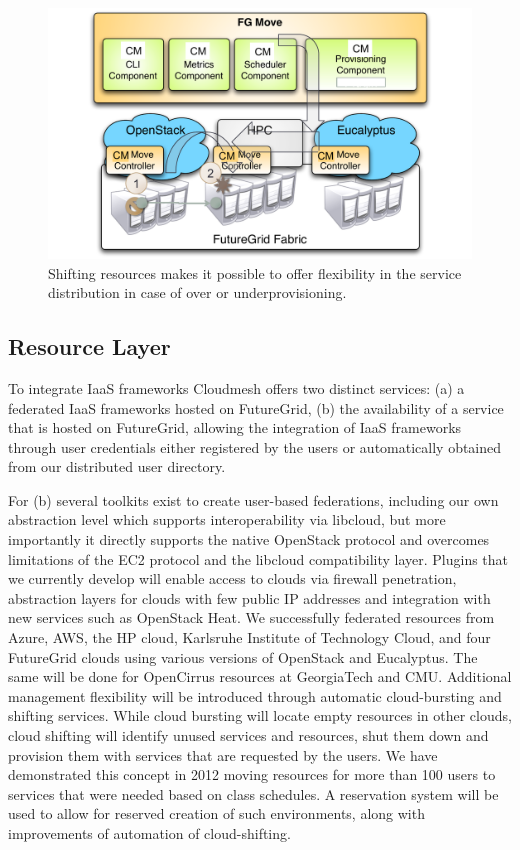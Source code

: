 \documentclass{tex/sig-alternate-2013}
\begin{document}
\begin{figure}[htb]
  \centering
    \includegraphics[width=1.0\columnwidth]{images/shift2.pdf}
  \caption{Shifting resources makes it possible to offer flexibility
    in the service distribution in case of over or underprovisioning.}\label{F:shift}
\end{figure}

\subsection{Resource Layer}

To integrate IaaS frameworks Cloudmesh offers two
distinct services: (a) a federated IaaS frameworks hosted on
FutureGrid, (b) the availability of a service that is hosted on
FutureGrid, allowing the integration of IaaS frameworks through user
credentials either registered by the users or automatically obtained
from our distributed user directory.

For (b) several toolkits exist to create user-based federations,
including our own abstraction level which supports interoperability
via libcloud, but more importantly it directly supports the native
OpenStack protocol and overcomes limitations of the EC2 protocol and
the libcloud compatibility layer. Plugins that we currently develop
will enable access to clouds via firewall penetration, abstraction
layers for clouds with few public IP addresses and integration with
new services such as OpenStack Heat. We successfully federated
resources from Azure, AWS, the HP cloud, Karlsruhe Institute of
Technology Cloud, and four FutureGrid clouds using various versions of
OpenStack and Eucalyptus. The same will be done for OpenCirrus
resources at GeorgiaTech and CMU.  Additional management flexibility
will be introduced through automatic cloud-bursting and shifting
services. While cloud bursting will locate empty resources in other
clouds, cloud shifting will identify unused services and resources,
shut them down and provision them with services that are requested by
the users. We have demonstrated this concept in 2012 moving resources
for more than 100 users to services that were needed based on class
schedules. A reservation system will be used to allow for reserved
creation of such environments, along with improvements of automation
of cloud-shifting.
\end{document}
